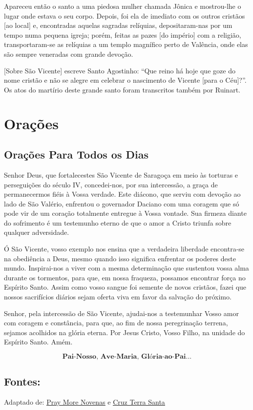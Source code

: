 \documentclass[a4paper,14pt]{extarticle} \usepackage[utf8]{inputenc}
\begin{document}
Apareceu então o santo a uma piedosa mulher chamada Jônica e mostrou-lhe o lugar onde estava o seu corpo. Depois, foi ela de imediato com os outros cristãos [ao local] e, encontradas aquelas sagradas relíquias, depositaram-nas por um tempo numa pequena igreja; porém, feitas as pazes [do império] com a religião, transportaram-se as relíquias a um templo magnífico perto de Valência, onde elas são sempre veneradas com grande devoção. 

[Sobre São Vicente] escreve Santo Agostinho: “Que reino há hoje que goze do nome cristão e não se alegre em celebrar o nascimento de Vicente [para o Céu]?”. Os atos do martírio deste grande santo foram transcritos também por Ruinart.

\newpage


\vfill

\section{Orações}

\subsection{Orações Para Todos os Dias}

Senhor Deus, que fortalecestes São Vicente de Saragoça em meio às torturas e perseguições do século IV, concedei-nos, por sua intercessão, a graça de permanecermos fiéis à Vossa verdade. Este diácono, que serviu com devoção ao lado de São Valério, enfrentou o governador Daciano com uma coragem que só pode vir de um coração totalmente entregue à Vossa vontade. Sua firmeza diante do sofrimento é um testemunho eterno de que o amor a Cristo triunfa sobre qualquer adversidade.

Ó São Vicente, vosso exemplo nos ensina que a verdadeira liberdade encontra-se na obediência a Deus, mesmo quando isso significa enfrentar os poderes deste mundo. Inspirai-nos a viver com a mesma determinação que sustentou vossa alma durante os tormentos, para que, em nossa fraqueza, possamos encontrar força no Espírito Santo. Assim como vosso sangue foi semente de novos cristãos, fazei que nossos sacrifícios diários sejam oferta viva em favor da salvação do próximo.

Senhor, pela intercessão de São Vicente, ajudai-nos a testemunhar Vosso amor com coragem e constância, para que, ao fim de nossa peregrinação terrena, sejamos acolhidos na glória eterna. Por Jesus Cristo, Vosso Filho, na unidade do Espírito Santo. Amém.

\[\textbf{Pai-Nosso, Ave-Maria, Glória-ao-Pai...}\]

\vfill

\begin{center}
\subsection*{Fontes:}
Adaptado de: {\color{blue} \underline{\href{https://www.praymorenovenas.com/holy-spouses-novena}{Pray More Novenas}}} e {\color{blue} \underline{\href{https://cruzterrasanta.com.br/sao-vicente-de-saragoca/540/105/}{Cruz Terra Santa}}}
\end{center}
\end{document}
